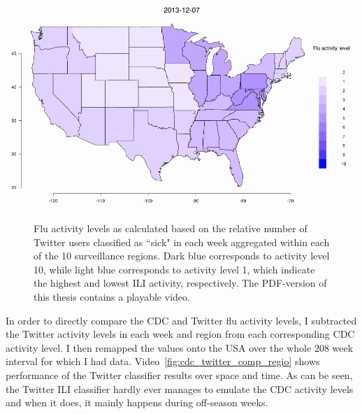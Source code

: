 \documentclass[11pt, a4paper,twoside]{report}\usepackage[]{graphicx}\usepackage[]{color}
\begin{document}
\begin{center}
\href{run:vids/2_twitter_flu_regio.avi}{\includegraphics[width=0.9\linewidth]{vids/2_twitter_flu_regio.png}}
\end{center}
\begin{figure}[H]
\centering
  \caption{Flu activity levels as calculated based on the relative number of Twitter users classified as ``sick" in each week aggregated within each of the 10 surveillance regions. Dark blue corresponds to activity level 10, while light blue corresponds to activity level 1, which indicate the highest and lowest ILI activity, respectively. The PDF-version of this thesis contains a playable video.}
    \label{fig:twitter_flu_regio}
\end{figure}

In order to directly compare the CDC and Twitter flu activity levels, I subtracted the Twitter activity levels in each week and region from each corresponding CDC activity level. I then remapped the values onto the USA over the whole 208 week interval for which I had data. Video~\ref{fig:cdc_twitter_comp_regio} shows performance of the Twitter classifier results over space and time. As can be seen, the Twitter ILI classifier hardly ever manages to emulate the CDC activity levels and when it does, it mainly happens during off-season weeks. 
\end{document}
